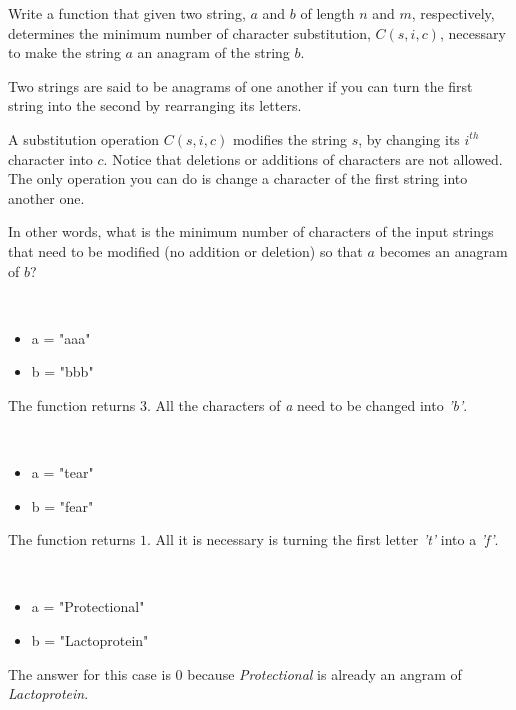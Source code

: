 	\begin{exercise}
		Write a function that given two string, $a$ and $b$ of length $n$ and $m$, respectively, determines the minimum number of character substitution, $C(s, i, c)$, necessary to make the string $a$ an anagram of the string $b$.

		Two strings are said to be anagrams of one another if you can turn the first string into the second by rearranging its letters. 

		A substitution operation $C(s,i,c)$ modifies the string $s$, by changing its $i^{th}$ character into $c$. Notice that deletions or additions of characters are not allowed.
		The only operation you can do is change a character of the first string into another one. 

		In other words, what is the minimum number of characters of the input strings that need to be modified (no addition or deletion)  so that $a$ becomes an anagram of $b$?
		
	\begin{example}
		\label{ex:two_string_anagram:example1}
		\hfill \\
		\begin{itemize}
			\item 	a = "aaa"
			\item 	b = "bbb"
		\end{itemize}
		The function returns $3$. 
		All the characters of \textit{a} need to be changed into \textit{'b'}.
		\label{ex:anagrams:example1}
	\end{example}

	\begin{example}
		\hfill \\
		\begin{itemize}
			\item 	a = "tear"
			\item	b = "fear"
		\end{itemize}
		The function returns $1$. 
		All it is necessary is turning the first letter \textit{'t'} into a \textit{'f'}.
	\end{example}

	\begin{example}
		\hfill \\
		\begin{itemize}
			\item[] 	a = "Protectional"
			\item[] 	b = "Lactoprotein"
		\end{itemize}
		The answer for this case is $0$ because \emph{Protectional} is already an angram of \emph{Lactoprotein}.
	\end{example}
\end{exercise}

